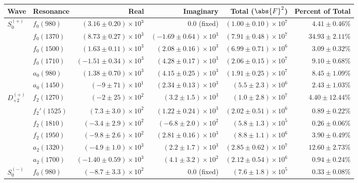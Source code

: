 \begin{table}[ht]
    \begin{center}
        \begin{tabular}{llrrrr}\toprule
        Wave & Resonance & Real & Imaginary & Total ($\abs{F}^2$) & Percent of Total \\\midrule
$S_{0}^{(+)}$ & $f_{0}(980)$ & $(3.16 \pm 0.20) \times 10^{3}$ & $0.0$ (fixed) & $(1.00 \pm 0.10) \times 10^{7}$ & $4.41 \pm 0.46 \%$ \\
 & $f_{0}(1370)$ & $(8.73 \pm 0.27) \times 10^{3}$ & $(-1.69 \pm 0.64) \times 10^{3}$ & $(7.91 \pm 0.48) \times 10^{7}$ & $34.93 \pm 2.11 \%$ \\
 & $f_{0}(1500)$ & $(1.63 \pm 0.11) \times 10^{3}$ & $(2.08 \pm 0.16) \times 10^{3}$ & $(6.99 \pm 0.71) \times 10^{6}$ & $3.09 \pm 0.32 \%$ \\
 & $f_{0}(1710)$ & $(-1.51 \pm 0.34) \times 10^{3}$ & $(4.28 \pm 0.17) \times 10^{3}$ & $(2.06 \pm 0.15) \times 10^{7}$ & $9.10 \pm 0.68 \%$ \\
 & $a_{0}(980)$ & $(1.38 \pm 0.70) \times 10^{3}$ & $(4.15 \pm 0.25) \times 10^{3}$ & $(1.91 \pm 0.25) \times 10^{7}$ & $8.45 \pm 1.09 \%$ \\
 & $a_{0}(1450)$ & $(-9 \pm 71) \times 10^{1}$ & $(2.34 \pm 0.13) \times 10^{3}$ & $(5.5 \pm 2.3) \times 10^{6}$ & $2.43 \pm 1.03 \%$ \\
$D_{+2}^{(+)}$ & $f_{2}(1270)$ & $(-2 \pm 25) \times 10^{2}$ & $(3.2 \pm 1.5) \times 10^{3}$ & $(1.0 \pm 2.8) \times 10^{7}$ & $4.40 \pm 12.44 \%$ \\
 & $f_{2}'(1525)$ & $(7.3 \pm 3.0) \times 10^{2}$ & $(1.22 \pm 0.24) \times 10^{3}$ & $(2.02 \pm 0.51) \times 10^{6}$ & $0.89 \pm 0.22 \%$ \\
 & $f_{2}(1810)$ & $(-3.4 \pm 2.9) \times 10^{2}$ & $(-6.8 \pm 2.0) \times 10^{2}$ & $(5.8 \pm 1.3) \times 10^{5}$ & $0.26 \pm 0.06 \%$ \\
 & $f_{2}(1950)$ & $(-9.8 \pm 2.6) \times 10^{2}$ & $(2.81 \pm 0.16) \times 10^{3}$ & $(8.8 \pm 1.1) \times 10^{6}$ & $3.90 \pm 0.49 \%$ \\
 & $a_{2}(1320)$ & $(-4.9 \pm 1.0) \times 10^{3}$ & $(2.2 \pm 1.7) \times 10^{3}$ & $(2.85 \pm 0.62) \times 10^{7}$ & $12.60 \pm 2.73 \%$ \\
 & $a_{2}(1700)$ & $(-1.40 \pm 0.59) \times 10^{3}$ & $(4.1 \pm 3.2) \times 10^{2}$ & $(2.12 \pm 0.54) \times 10^{6}$ & $0.94 \pm 0.24 \%$ \\
$S_{0}^{(-)}$ & $f_{0}(980)$ & $(-8.7 \pm 3.3) \times 10^{2}$ & $0.0$ (fixed) & $(7.6 \pm 1.8) \times 10^{5}$ & $0.33 \pm 0.08 \%$ \\

\end{tabular}
\end{center}
\end{table}

